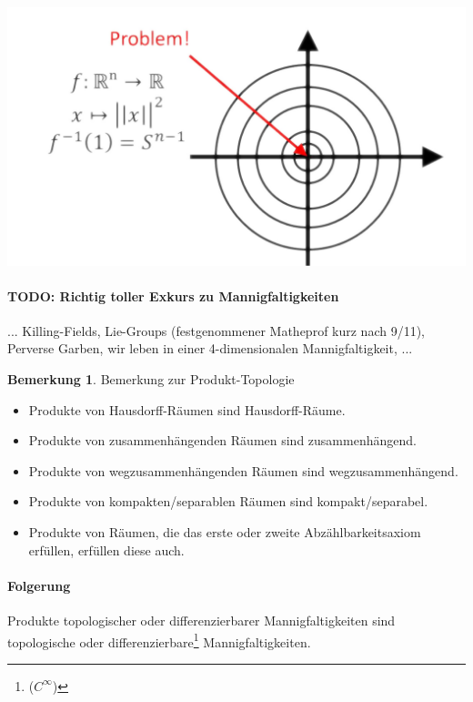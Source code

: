 \documentclass[a4paper,11pt,notitlepage]{report}
\theoremstyle{definition}
\newtheorem{remark}{Bemerkung}[chapter]
\begin{document}
\includegraphics[scale=0.3]{images/Norm_invers.png}

\paragraph{TODO: Richtig toller Exkurs zu Mannigfaltigkeiten}... Killing-Fields, Lie-Groups (festgenommener Matheprof kurz nach 9/11), Perverse Garben, wir leben in einer 4-dimensionalen Mannigfaltigkeit, ...

\begin{remark}{Bemerkung zur Produkt-Topologie}
\begin{itemize}
	\item Produkte von Hausdorff-Räumen sind Hausdorff-Räume.
	\item Produkte von zusammenhängenden Räumen sind zusammenhängend.
	\item Produkte von wegzusammenhängenden Räumen sind wegzusammenhängend.
	\item Produkte von kompakten/separablen Räumen sind kompakt/separabel.
	\item Produkte von Räumen, die das erste oder zweite Abzählbarkeitsaxiom erfüllen, erfüllen diese auch.
\end{itemize}
 
\paragraph{Folgerung}
	Produkte topologischer oder differenzierbarer Mannigfaltigkeiten sind topologische oder differenzierbare\footnote{($C^\infty$)} Mannigfaltigkeiten.
\end{remark}
 
\end{document}
